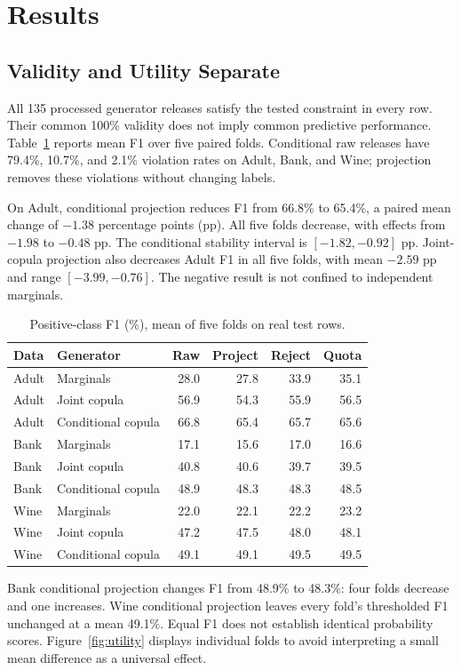 \documentclass{svproc}
\begin{document}
\section{Results}
\subsection{Validity and Utility Separate}
All 135 processed generator releases satisfy the tested constraint in every row. Their common 100\% validity does not imply common predictive performance. Table~\ref{tab:utility} reports mean F1 over five paired folds. Conditional raw releases have 79.4\%, 10.7\%, and 2.1\% violation rates on Adult, Bank, and Wine; projection removes these violations without changing labels.

On Adult, conditional projection reduces F1 from 66.8\% to 65.4\%, a paired mean change of $-1.38$ percentage points (pp). All five folds decrease, with effects from $-1.98$ to $-0.48$ pp. The conditional stability interval is $[-1.82,-0.92]$ pp. Joint-copula projection also decreases Adult F1 in all five folds, with mean $-2.59$ pp and range $[-3.99,-0.76]$. The negative result is not confined to independent marginals.

\begin{table}[!htbp]
\caption{Positive-class F1 (\%), mean of five folds on real test rows.}\label{tab:utility}
\centering\small
\begin{tabular}{llrrrr}\toprule
Data & Generator & Raw & Project & Reject & Quota \\\midrule
Adult & Marginals & 28.0 & 27.8 & 33.9 & 35.1 \\
Adult & Joint copula & 56.9 & 54.3 & 55.9 & 56.5 \\
Adult & Conditional copula & 66.8 & 65.4 & 65.7 & 65.6 \\
Bank & Marginals & 17.1 & 15.6 & 17.0 & 16.6 \\
Bank & Joint copula & 40.8 & 40.6 & 39.7 & 39.5 \\
Bank & Conditional copula & 48.9 & 48.3 & 48.3 & 48.5 \\
Wine & Marginals & 22.0 & 22.1 & 22.2 & 23.2 \\
Wine & Joint copula & 47.2 & 47.5 & 48.0 & 48.1 \\
Wine & Conditional copula & 49.1 & 49.1 & 49.5 & 49.5 \\
\bottomrule\end{tabular}
\end{table}

Bank conditional projection changes F1 from 48.9\% to 48.3\%: four folds decrease and one increases. Wine conditional projection leaves every fold's thresholded F1 unchanged at a mean 49.1\%. Equal F1 does not establish identical probability scores. Figure~\ref{fig:utility} displays individual folds to avoid interpreting a small mean difference as a universal effect.
\end{document}
